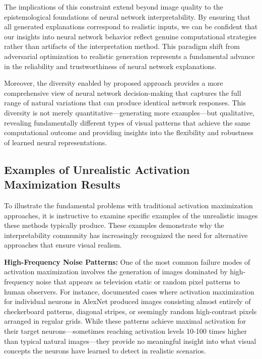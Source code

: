 The implications of this constraint extend beyond image quality to the epistemological foundations of neural network interpretability. By ensuring that all generated explanations correspond to realistic inputs, we can be confident that our insights into neural network behavior reflect genuine computational strategies rather than artifacts of the interpretation method. This paradigm shift from adversarial optimization to realistic generation represents a fundamental advance in the reliability and trustworthiness of neural network explanations.

Moreover, the diversity enabled by proposed approach provides a more comprehensive view of neural network decision-making that captures the full range of natural variations that can produce identical network responses. This diversity is not merely quantitative—generating more examples—but qualitative, revealing fundamentally different types of visual patterns that achieve the same computational outcome and providing insights into the flexibility and robustness of learned neural representations.

\subsection{Examples of Unrealistic Activation Maximization Results}

To illustrate the fundamental problems with traditional activation maximization approaches, it is instructive to examine specific examples of the unrealistic images these methods typically produce. These examples demonstrate why the interpretability community has increasingly recognized the need for alternative approaches that ensure visual realism.

\textbf{High-Frequency Noise Patterns:} One of the most common failure modes of activation maximization involves the generation of images dominated by high-frequency noise that appears as television static or random pixel patterns to human observers. For instance, \citet{olah2017feature} documented cases where activation maximization for individual neurons in AlexNet produced images consisting almost entirely of checkerboard patterns, diagonal stripes, or seemingly random high-contrast pixels arranged in regular grids. While these patterns achieve maximal activation for their target neurons—sometimes reaching activation levels 10-100 times higher than typical natural images—they provide no meaningful insight into what visual concepts the neurons have learned to detect in realistic scenarios.

